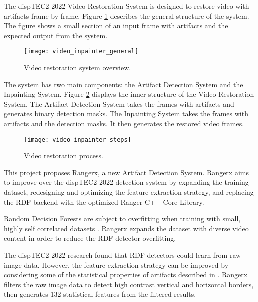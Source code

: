 The dispTEC2-2022 Video Restoration System is designed to restore video with artifacts frame by frame. Figure \ref{fig:restoration_system_overview} describes the general structure of the system. The figure shows a small section of an input frame with artifacts and the expected output from the system.

\begin{figure} [!h]
  \centering
  
  \texttt{[image: video\_inpainter\_general]}
  
  \caption{Video restoration system overview.}
  \label{fig:restoration_system_overview}

\end{figure}

The system has two main components: the Artifact Detection System and the Inpainting System. Figure \ref{fig:restoration_system_steps} displays the inner structure of the Video Restoration System. The Artifact Detection System takes the frames with artifacts and generates binary detection masks. The Inpainting System takes the frames with artifacts and the detection masks. It then generates the restored video frames.

\begin{figure} [!h]
  \centering
  
  \texttt{[image: video\_inpainter\_steps]}
  
  \caption{Video restoration process. }
  \label{fig:restoration_system_steps}

\end{figure}

This project proposes Rangerx, a new Artifact Detection System. Rangerx aims to improve over the dispTEC2-2022 detection system by expanding the training dataset, redesigning and optimizing the feature extraction strategy, and replacing the RDF backend with the optimized Ranger C++ Core Library.

Random Decision Forests are subject to overfitting when training with small, highly self correlated datasets \cite{Breiman2001}. Rangerx expands the dataset with diverse video content in order to reduce the RDF detector overfitting.

The dispTEC2-2022 research found that RDF detectors could learn from raw image data. However, the feature extraction strategy can be improved by considering some of the statistical properties of artifacts described in \cite{Vranjes2019, Glavota2018}. Rangerx filters the raw image data to detect high contrast vertical and horizontal borders, then generates 132 statistical features from the filtered results.

